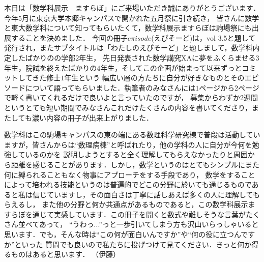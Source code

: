 本日は「数学科展示　ますらぼ」にご来場いただき誠にありがとうございます．今年5月に東京大学本郷キャンパスで開かれた五月祭に引き続き，
皆さんに数学と東大数学科について知ってもらいたくて，数学科展示ますらぼは駒場祭にも出展することを決めました．
今回の冊子$e\pi isode$(えぴそーど)は，vol 3.5と題して発行され，またサブタイトルは「わたしのえぴそーど」と題しまして，数学科内定したばかりのの学部$2$年生，
先日発表された数学講究XAに夢をふくらませる$3$年生，院試を終えたばかりの$4$年生，そしてこの企画が始まって以来ずっとコミットしてきた修士$1$年生という
幅広い層の方たちに自分が好きなものとそのエピソードについて語ってもらいました．執筆者のみなさんには$1$ページから$2$ページで軽く書いてくれるだけで良いよと言っていたのですが，
募集からわずか$2$週間というとても短い期間でみなさんこれだけたくさんの内容を書いてくださり，またしても濃い内容の冊子が出来上がりました．

数学科はこの駒場キャンパスの東の端にある数理科学研究棟で普段は活動していますが，皆さんからは``数理病棟''と呼ばれたり，他の学科の人に自分が今何を勉強しているのかを
説明しようとすると全く理解してもらえなかったりと周囲から距離を感じることがあります．しかし，数学というのはとてもシンプルにまた何に縛られることもなく物事にアプローチをする手段であり，
数学をすることによって培われる技能というのは普遍的でどこの分野に於いても通じるものであると私は信じていますし，その面白さは丁寧に話しあえば多くの人に理解してもらえるし，
また他の分野と何か共通点があるものであると，この数学科展示ますらぼを通じて実感しています．この冊子を開くと数式や難しそうな言葉がたくさん並べてあって，
``うわっ...''っと一歩引いてしまう方も沢山いらっしゃいると思います．でも，そんな時は``この何が面白いんですか''や``何の役に立つんですか''といった
質問でも良いので私たちに投げつけて見てください．きっと何か得るものはあると思います．
（伊藤）
